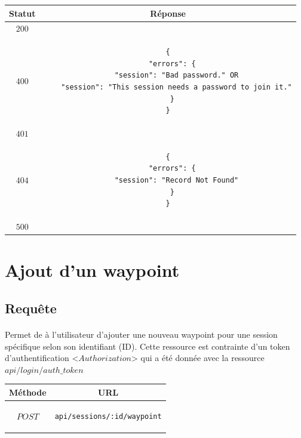 \documentclass[titlepage, 12pt]{report}
\begin{document}
\begin{center}
	\begin{tabular}{|c|c|}
		\hline
		Statut & Réponse \\
		\hline
		$ 200 $ & \\ 
		\hline
		$ 400 $ & \begin{lstlisting}
{
  "errors": {
    "session": "Bad password." OR
    "session": "This session needs a password to join it."
  }
}
		\end{lstlisting} \\
		\hline
		$ 401 $ & \\
		\hline
		$ 404 $ & \begin{lstlisting}
{
  "errors": {
    "session": "Record Not Found"
  }
}
		\end{lstlisting} \\
		\hline
		$ 500 $ & \\
		\hline
	\end{tabular}
\end{center}

%
%

\section{Ajout d'un waypoint}

\subsection{Requête}

\paragraph{} Permet de à l'utilisateur d'ajouter une nouveau waypoint pour une session spécifique selon son identifiant (ID). Cette ressource est contrainte d'un token d'authentification <$Authorization$> qui a été donnée avec la ressource $api/login/auth\_token$

\begin{center}
	\begin{tabular}{|c|c|}
	\hline
	Méthode & URL \\
	\hline
	$ POST $ 
	&
	\begin{lstlisting}
api/sessions/:id/waypoint
	\end{lstlisting} 
	\\ \hline
	\end{tabular}
\end{center}
\end{document}
